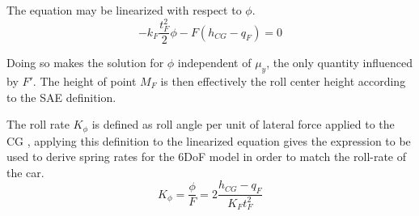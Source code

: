  The equation may be linearized with respect to $\phi$.
$$
- k_F \frac{t_F^2}{2}  \phi  - F(h_{CG}-q_F) = 0
$$

Doing so makes the solution for $\phi$ independent of $\mu_y$, the only quantity influenced by $F'$. The height of point $M_F$ is then effectively the roll center height according to the SAE definition.

The roll rate $K_\phi$ is defined as roll angle per unit of lateral force applied to the CG , applying this definition to the linearized equation gives the expression to be used to derive spring rates for the 6DoF model in order to match the roll-rate of the car.
$$
K_\phi = \frac{\phi}{F} = 2\frac{h_{CG}-q_F}{K_Ft_F^2}
$$
